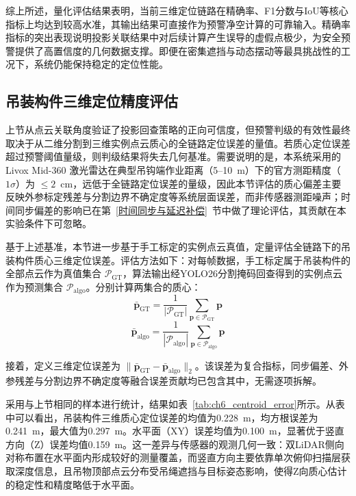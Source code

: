 综上所述，量化评估结果表明，当前三维定位链路在精确率、F1分数与IoU等核心指标上均达到较高水准，其输出结果可直接作为预警净空计算的可靠输入。精确率指标的突出表现说明投影关联结果中对后续计算产生误导的虚假点极少，为安全预警提供了高置信度的几何数据支撑。即便在密集遮挡与动态摆动等最具挑战性的工况下，系统仍能保持稳定的定位性能。

\subsection{吊装构件三维定位精度评估}\label{subsec_ch6_localization_error}

上节从点云关联角度验证了投影回查策略的正向可信度，但预警判级的有效性最终取决于从二维分割到三维实例点云质心的全链路定位误差的量值。若质心定位误差超过预警阈值量级，则判级结果将失去几何基准。需要说明的是，本系统采用的 Livox Mid-360 激光雷达在典型吊钩端作业距离（5–10~m）下的官方测距精度（$1\sigma$）为 $\leq 2$~cm，远低于全链路定位误差的量级，因此本节评估的质心偏差主要反映外参标定残差与分割边界不确定度等系统层面误差，而非传感器测距噪声；时间同步偏差的影响已在第~\ref{时间同步与延迟补偿}~节中做了理论评估，其贡献在本实验条件下可忽略。

基于上述基准，本节进一步基于手工标定的实例点云真值，定量评估全链路下的吊装构件质心三维定位误差。评估方法如下：对每帧数据，手工标定属于吊装构件的全部点云作为真值集合 $\mathcal{P}_{\mathrm{GT}}$，算法输出经YOLO26分割掩码回查得到的实例点云作为预测集合 $\mathcal{P}_{\mathrm{algo}}$。分别计算两集合的质心：
\begin{equation}
\bar{\mathbf{p}}_{\mathrm{GT}} = \frac{1}{|\mathcal{P}_{\mathrm{GT}}|}\sum_{\mathbf{p}\in\mathcal{P}_{\mathrm{GT}}}\mathbf{p}
\label{eq:ch6_centroid_gt}
\end{equation}
\begin{equation}
\bar{\mathbf{p}}_{\mathrm{algo}} = \frac{1}{|\mathcal{P}_{\mathrm{algo}}|}\sum_{\mathbf{p}\in\mathcal{P}_{\mathrm{algo}}}\mathbf{p}
\label{eq:ch6_centroid_algo}
\end{equation}

接着，定义三维定位误差为 $\|\bar{\mathbf{p}}_{\mathrm{GT}}-\bar{\mathbf{p}}_{\mathrm{algo}}\|_2$。该误差为复合指标，同步偏差、外参残差与分割边界不确定度等融合误差贡献均已包含其中，无需逐项拆解。

采用与上节相同的样本进行统计，结果如表~\ref{tab:ch6_centroid_error}所示。从表中可以看出，吊装构件三维质心定位误差的均值为0.228~m，均方根误差为0.241~m，最大值为0.297~m。水平面（XY）误差均值为0.100~m，显著优于竖直方向（Z）误差均值0.159~m。这一差异与传感器的观测几何一致：双LiDAR侧向对称布置在水平面内形成较好的测量覆盖，而竖直方向主要依靠单次俯仰扫描层获取深度信息，且吊物顶部点云分布受吊绳遮挡与目标姿态影响，使得Z向质心估计的稳定性和精度略低于水平面。

